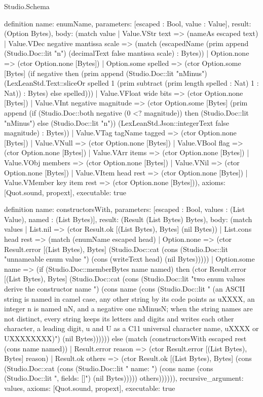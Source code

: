 \begin{lexlean}{Studio.Schema}
\begin{semanticmodule}
definition{
  name: enumName,
  parameters: [escaped : Bool, value : Value],
  result: (Option Bytes),
  body: (match value
    | Value.VStr text => (nameAs escaped text)
    | Value.VDec negative mantissa scale => (match (escapedName (prim append (Studio.Doc::lit "n") (decimalText false mantissa scale) : Bytes))
      | Option.none => (ctor Option.none [Bytes])
      | Option.some spelled => (ctor Option.some [Bytes] (if negative then (prim append (Studio.Doc::lit "nMinus") (LexLeanStd.Text::sliceOr spelled 1 (prim subtract (prim length spelled : Nat) 1 : Nat)) : Bytes) else spelled)))
    | Value.VFloat wide bits => (ctor Option.none [Bytes])
    | Value.VInt negative magnitude => (ctor Option.some [Bytes] (prim append (if (Studio.Doc::both negative (0 <? magnitude)) then (Studio.Doc::lit "nMinus") else (Studio.Doc::lit "n")) (LexLeanStd.Json::integerText false magnitude) : Bytes))
    | Value.VTag tagName tagged => (ctor Option.none [Bytes])
    | Value.VNull => (ctor Option.none [Bytes])
    | Value.VBool flag => (ctor Option.none [Bytes])
    | Value.VArr items => (ctor Option.none [Bytes])
    | Value.VObj members => (ctor Option.none [Bytes])
    | Value.VNil => (ctor Option.none [Bytes])
    | Value.VItem head rest => (ctor Option.none [Bytes])
    | Value.VMember key item rest => (ctor Option.none [Bytes])),
  axioms: [Quot.sound, propext],
  executable: true
}

definition{
  name: constructorsWith,
  parameters: [escaped : Bool, values : (List Value), named : (List Bytes)],
  result: (Result (List Bytes) Bytes),
  body: (match values
    | List.nil => (ctor Result.ok [(List Bytes), Bytes] (nil Bytes))
    | List.cons head rest => (match (enumName escaped head)
      | Option.none => (ctor Result.error [(List Bytes), Bytes] (Studio.Doc::cat (cons (Studio.Doc::lit "unnameable enum value ") (cons (writeText head) (nil Bytes)))))
      | Option.some name => (if (Studio.Doc::memberBytes name named) then (ctor Result.error [(List Bytes), Bytes] (Studio.Doc::cat (cons (Studio.Doc::lit "two enum values derive the constructor name ") (cons name (cons (Studio.Doc::lit " (an ASCII string is named in camel case, any other string by its code points as uXXXX, an integer n is named nN, and a negative one nMinusN; when the string names are not distinct, every string keeps its letters and digits and writes each other character, a leading digit, u and U as a C11 universal character name, uXXXX or UXXXXXXXX)") (nil Bytes)))))) else (match (constructorsWith escaped rest (cons name named))
        | Result.error reason => (ctor Result.error [(List Bytes), Bytes] reason)
        | Result.ok others => (ctor Result.ok [(List Bytes), Bytes] (cons (Studio.Doc::cat (cons (Studio.Doc::lit "    {name: ") (cons name (cons (Studio.Doc::lit ", fields: []}") (nil Bytes))))) others)))))),
  recursive_argument: values,
  axioms: [Quot.sound, propext],
  executable: true
}


\end{semanticmodule}
\end{lexlean}
